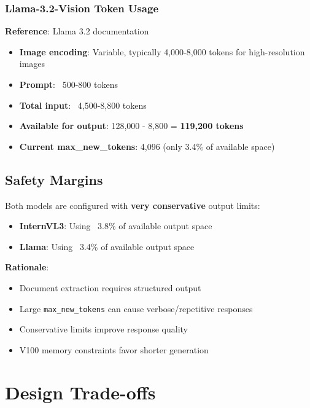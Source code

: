 \documentclass[11pt,a4paper]{article}
\begin{document}
\subsubsection{Llama-3.2-Vision Token Usage}

\textbf{Reference}: Llama 3.2 documentation

\begin{itemize}[leftmargin=*]
    \item \textbf{Image encoding}: Variable, typically 4,000-8,000 tokens for high-resolution images
    \item \textbf{Prompt}: ~500-800 tokens
    \item \textbf{Total input}: ~4,500-8,800 tokens
    \item \textbf{Available for output}: 128,000 - 8,800 = \textbf{119,200 tokens}
    \item \textbf{Current max\_new\_tokens}: 4,096 (only 3.4\% of available space)
\end{itemize}

\subsection{Safety Margins}

Both models are configured with \textbf{very conservative} output limits:

\begin{itemize}[leftmargin=*]
    \item \textbf{InternVL3}: Using ~3.8\% of available output space
    \item \textbf{Llama}: Using ~3.4\% of available output space
\end{itemize}

\textbf{Rationale}:
\begin{itemize}[leftmargin=*]
    \item Document extraction requires structured output
    \item Large \texttt{max\_new\_tokens} can cause verbose/repetitive responses
    \item Conservative limits improve response quality
    \item V100 memory constraints favor shorter generation
\end{itemize}

\section{Design Trade-offs}
\end{document}
